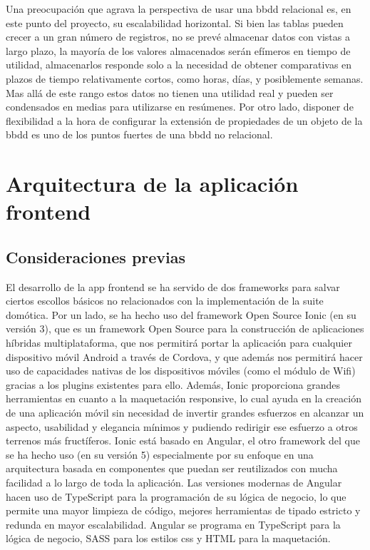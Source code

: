 Una preocupación que agrava la perspectiva de usar una \gls{bbdd} relacional es, en este punto del proyecto, su escalabilidad horizontal. Si bien las tablas pueden crecer a un gran número de registros, no se prevé almacenar datos con vistas a largo plazo, la mayoría de los valores almacenados serán efímeros en tiempo de utilidad, almacenarlos responde solo a la necesidad de obtener comparativas en plazos de tiempo relativamente cortos, como horas, días, y posiblemente semanas. Mas allá de este rango estos datos no tienen una utilidad real y pueden ser condensados en medias para utilizarse en resúmenes. Por otro lado, disponer de flexibilidad a la hora de configurar la extensión de propiedades de un objeto de la \gls{bbdd} es uno de los puntos fuertes de una \gls{bbdd} no relacional.


\section{Arquitectura de la aplicación frontend}
\label{makereference4.5}

\subsection{Consideraciones previas}
\label{makereference4.5.1}

El desarrollo de la app frontend se ha servido de dos frameworks para salvar ciertos escollos básicos no relacionados con la implementación de la suite domótica. Por un lado, se ha hecho uso del framework Open Source Ionic (en su versión 3), que es un framework Open Source para la construcción de aplicaciones híbridas multiplataforma, que nos permitirá portar la aplicación para cualquier dispositivo móvil Android a través de Cordova, y que además nos permitirá hacer uso de capacidades nativas de los dispositivos móviles (como el módulo de Wifi) gracias a los plugins existentes para ello. Además, Ionic proporciona grandes herramientas en cuanto a la maquetación responsive, lo cual ayuda en la creación de una aplicación móvil sin necesidad de invertir grandes esfuerzos en alcanzar un aspecto, usabilidad y elegancia mínimos y pudiendo redirigir ese esfuerzo a otros terrenos más fructíferos. Ionic está basado en Angular, el otro framework del que se ha hecho uso (en su versión 5) especialmente por su enfoque en una arquitectura basada en componentes que puedan ser reutilizados con mucha facilidad a lo largo de toda la aplicación. Las versiones modernas de Angular hacen uso de TypeScript para la programación de su lógica de negocio, lo que permite una mayor limpieza de código, mejores herramientas de tipado estricto y redunda en mayor escalabilidad. Angular se programa en TypeScript para la lógica de negocio, SASS para los estilos css y HTML para la maquetación.

